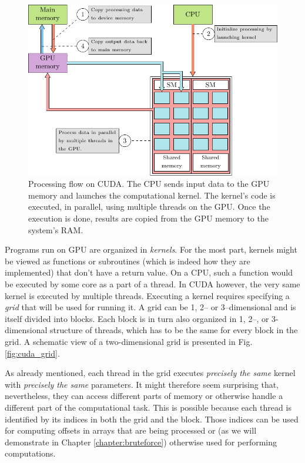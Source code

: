 \begin{figure}[ht]
  \centering
  \includegraphics[width=\textwidth]{figures/cuda_workflow}
  \caption{Processing flow on CUDA. The CPU sends input data to the GPU memory and
    launches the computational kernel. The kernel's code is executed, in parallel,
    using multiple threads on the GPU. Once the execution is done, results are
    copied from the GPU memory to the system's RAM.} \label{fig:cuda_flow}
\end{figure}

Programs run on GPU are organized in \emph{kernels}. For the most part, kernels
might be viewed as functions or subroutines (which is indeed how they are
implemented) that don't have a return value. On a CPU, such a function would be
executed by some core as a part of a thread. In CUDA however, the very same
kernel is executed by multiple threads. Executing a kernel requires specifying
a \emph{grid} that will be used for running it. A grid can be 1, 2-- or
3--dimensional and is itself divided into blocks. Each block is in turn also
organized in 1, 2--, or 3-dimensional structure of threads, which has to be the
same for every block in the grid. A schematic view of a two-dimensional grid is
presented in Fig. \ref{fig:cuda_grid}.

As already mentioned, each thread in the grid executes \emph{precisely the
  same} kernel with \emph{precisely the same} parameters. It might therefore seem
surprising that, nevertheless, they can access different parts of memory or
otherwise handle a different part of the computational task. This is possible
because each thread is identified by its indices in both the grid and the
block. Those indices can be used for computing offsets in arrays that are being
processed or (as we will demonstrate in Chapter \ref{chapter:bruteforce})
otherwise used for performing computations.

